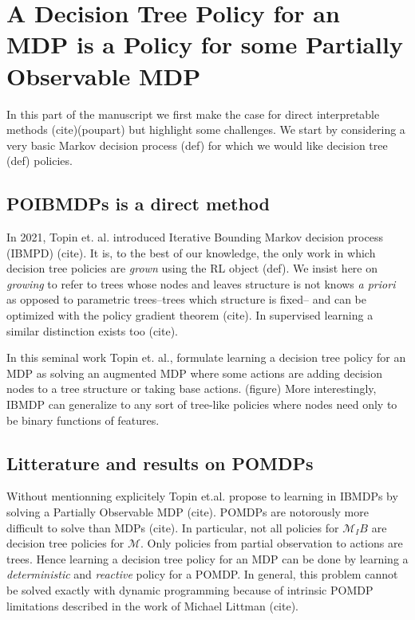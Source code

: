 \chapter{A Decision Tree Policy for an MDP is a Policy for some Partially Observable MDP}

    In this part of the manuscript we first make the case for direct interpretable methods (cite)(poupart) but highlight some challenges.
We start by considering a very basic Markov decision process (def) for which we would like decision tree (def) policies. 
 
\section{POIBMDPs is a direct method}
In 2021, Topin et. al. introduced Iterative Bounding Markov decision process (IBMPD) (cite). It is, to the best of our knowledge, the only work in which decision tree policies are \textit{grown} using the RL object (def).
We insist here on \textit{growing} to refer to trees whose nodes and leaves structure is not knows \textit{a priori} as opposed to parametric trees--trees which structure is fixed-- and can be optimized with the policy gradient theorem (cite).
In supervised learning a similar distinction exists too (cite). 

In this seminal work Topin et. al., formulate learning a decision tree policy for an MDP as solving an augmented MDP where some actions are adding decision nodes to a tree structure or taking base actions. (figure)
More interestingly, IBMDP can generalize to any sort of tree-like policies where nodes need only to be binary functions of features.  

\section{Litterature and results on POMDPs}
Without mentionning explicitely Topin et.al. propose to learning in IBMDPs by solving a Partially Observable MDP (cite). POMDPs are notorously more difficult to solve than MDPs (cite).
In particular, not all policies for $\mathcal{M}_IB$ are decision tree policies for $\mathcal{M}$. Only policies from partial observation to actions are trees. 
Hence learning a decision tree policy for an MDP can be done by learning a \textit{deterministic} and \textit{reactive} policy for a POMDP. 
In general, this problem cannot be solved exactly with dynamic programming because of intrinsic POMDP limitations described in the work of Michael Littman (cite).

